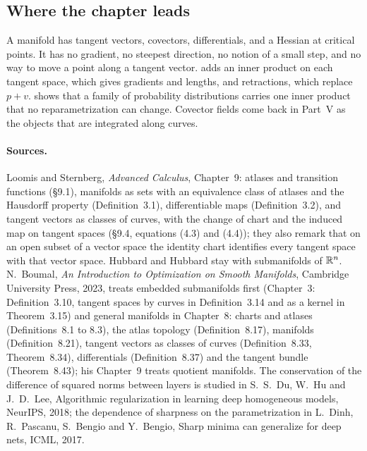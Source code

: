 \begin{notechapter}
\section{Where the chapter leads}\label{tangent-bundles:sec:outlook}

A manifold has tangent vectors, covectors, differentials, and a Hessian
at critical points. It has no gradient, no steepest direction, no notion
of a small step, and no way to move a point along a tangent vector.
 adds an inner product on each tangent
space, which gives gradients and lengths, and retractions, which replace
$p + v$.  shows that a family of
probability distributions carries one inner product that no
reparametrization can change. Covector fields come back in Part~V as the
objects that are integrated along curves.

\paragraph{Sources.} Loomis and Sternberg, \emph{Advanced Calculus},
Chapter~9: atlases and transition functions (\S9.1), manifolds as sets
with an equivalence class of atlases and the Hausdorff property
(Definition~3.1), differentiable maps (Definition~3.2), and tangent
vectors as classes of curves, with the change of chart and the induced
map on tangent spaces (\S9.4, equations (4.3) and (4.4)); they also
remark that on an open subset of a vector space the identity chart
identifies every tangent space with that vector space. Hubbard and
Hubbard stay with submanifolds of $\mathbb{R}^n$. N.~Boumal, \emph{An
Introduction to Optimization on Smooth Manifolds}, Cambridge University
Press, 2023, treats embedded submanifolds first (Chapter~3:
Definition~3.10, tangent spaces by curves in Definition~3.14 and as a
kernel in Theorem~3.15) and general manifolds in Chapter~8: charts and
atlases (Definitions~8.1 to 8.3), the atlas topology (Definition~8.17),
manifolds (Definition~8.21), tangent vectors as classes of curves
(Definition~8.33, Theorem~8.34), differentials (Definition~8.37) and the
tangent bundle (Theorem~8.43); his Chapter~9 treats quotient manifolds.
The conservation of the difference of squared norms between layers is
studied in S.~S.~Du, W.~Hu and J.~D.~Lee, Algorithmic regularization in
learning deep homogeneous models, NeurIPS, 2018; the dependence of
sharpness on the parametrization in L.~Dinh, R.~Pascanu, S.~Bengio and
Y.~Bengio, Sharp minima can generalize for deep nets, ICML, 2017.


\end{notechapter}
